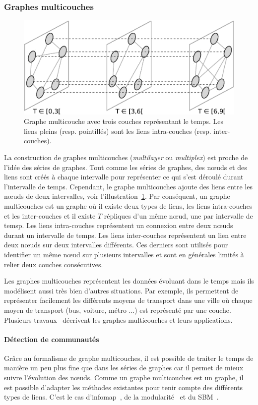 \subsubsection{Graphes multicouches}
\begin{figure}[h]
\centering
\includegraphics[width=0.7\linewidth]{img/Intro/multiplex.eps}
\caption{Graphe multicouche avec trois couches représentant le temps.
Les liens pleins (resp. pointillés) sont les liens intra-couches (resp. inter-couches).}
\label{fig:exemple_multiplex}
\end{figure}
La construction de graphes multicouches (\emph{multilayer} ou \emph{multiplex}) est proche de l'idée des séries de graphes.
Tout comme les séries de graphes, des n\oe uds et des liens sont créés à chaque intervalle pour représenter ce qui s'est déroulé durant l'intervalle de temps.
Cependant, le graphe multicouches ajoute des liens entre les n\oe uds de deux intervalles, voir l'illustration~\ref{fig:exemple_multiplex}.
Par conséquent, un graphe multicouches est un graphe où il existe deux types de liens, les liens intra-couches et les inter-couches et il existe $T$ répliques d'un même n\oe ud, une par intervalle de temsp.
Les liens intra-couches représentent un connexion entre deux n\oe uds durant un intervalle de temps.
Les liens inter-couches représentent un lien entre deux n\oe uds sur deux intervalles différents.
Ces derniers sont utilisés pour identifier un même n\oe ud sur plusieurs intervalles et sont en générales limités à relier deux couches consécutives.

Les graphes multicouches représentent les données évoluant dans le temps mais ils modélisent aussi très bien d'autres situations.
Par exemple, ils permettent de représenter facilement les différents moyens de transport dans une ville où chaque moyen de transport (bus, voiture, métro ...) est représenté par une couche.
Plusieurs travaux~\cite{DeDomenico2013,Kivela2014,Boccaletti2014} décrivent les graphes multicouches et leurs applications.



\paragraph{Détection de communautés}
Grâce au formalisme de graphe multicouches, il est possible de traiter le temps de manière un peu plus fine que dans les séries de graphes car il permet de mieux suivre l'évolution des n\oe uds.
Comme un graphe multicouches est un graphe, il est possible d'adapter les méthodes existantes pour tenir compte des différents types de liens.
C'est le cas d'infomap~\cite{DeDomenico2014}, de la modularité~\cite{Mucha2010,Bassett2013,Bazzi2016} et du SBM~\cite{Stanley2015,Peixoto2015c}.


